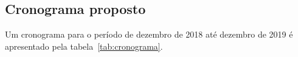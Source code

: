 \documentclass[12pt]{article}
\begin{document}
\subsection{Cronograma proposto}

Um cronograma para o período de dezembro de 2018 até dezembro de 2019
é apresentado pela tabela~\ref{tab:cronograma}.

\end{document}
